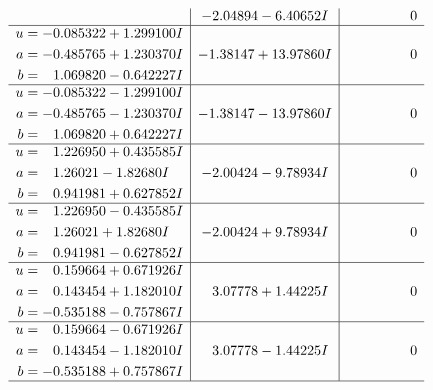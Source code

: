 \documentclass[1p]{elsarticle_modified}
\theoremstyle{definition}
\begin{document}
$$\begin{array}{c|c|c}
 & -2.04894 - 6.40652 I & \phantom{-0.000000 } 0 \\ \hline\begin{aligned}
u &= -0.085322 + 1.299100 I \\
a &= -0.485765 + 1.230370 I \\
b &= \phantom{-}1.069820 - 0.642227 I\end{aligned}
 & -1.38147 + 13.97860 I & \phantom{-0.000000 } 0 \\ \hline\begin{aligned}
u &= -0.085322 - 1.299100 I \\
a &= -0.485765 - 1.230370 I \\
b &= \phantom{-}1.069820 + 0.642227 I\end{aligned}
 & -1.38147 - 13.97860 I & \phantom{-0.000000 } 0 \\ \hline\begin{aligned}
u &= \phantom{-}1.226950 + 0.435585 I \\
a &= \phantom{-}1.26021 - 1.82680 I \\
b &= \phantom{-}0.941981 + 0.627852 I\end{aligned}
 & -2.00424 - 9.78934 I & \phantom{-0.000000 } 0 \\ \hline\begin{aligned}
u &= \phantom{-}1.226950 - 0.435585 I \\
a &= \phantom{-}1.26021 + 1.82680 I \\
b &= \phantom{-}0.941981 - 0.627852 I\end{aligned}
 & -2.00424 + 9.78934 I & \phantom{-0.000000 } 0 \\ \hline\begin{aligned}
u &= \phantom{-}0.159664 + 0.671926 I \\
a &= \phantom{-}0.143454 + 1.182010 I \\
b &= -0.535188 - 0.757867 I\end{aligned}
 & \phantom{-}3.07778 + 1.44225 I & \phantom{-0.000000 } 0 \\ \hline\begin{aligned}
u &= \phantom{-}0.159664 - 0.671926 I \\
a &= \phantom{-}0.143454 - 1.182010 I \\
b &= -0.535188 + 0.757867 I\end{aligned}
 & \phantom{-}3.07778 - 1.44225 I & \phantom{-0.000000 } 0\\
 \hline 
 \end{array}$$\newpage$$\begin{array}{c|c|c}  

\end{array}$$
\end{document}
